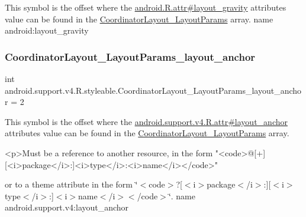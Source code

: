 This symbol is the offset where the \hyperlink{}{android.\+R.\+attr\#layout\+\_\+gravity} attribute\textquotesingle{}s value can be found in the \hyperlink{classandroid_1_1support_1_1v4_1_1R_1_1styleable_a9b9df68895be97c43703c5d0a130e2d9}{Coordinator\+Layout\+\_\+\+Layout\+Params} array.  name android\+:layout\+\_\+gravity \mbox{\label{classandroid_1_1support_1_1v4_1_1R_1_1styleable_aa0e6a723ba8e1e1b09bbd5bbcd81a3f2}} 
\subsubsection{\texorpdfstring{Coordinator\+Layout\+\_\+\+Layout\+Params\+\_\+layout\+\_\+anchor}{CoordinatorLayout\_LayoutParams\_layout\_anchor}}
{\footnotesize\ttfamily int android.\+support.\+v4.\+R.\+styleable.\+Coordinator\+Layout\+\_\+\+Layout\+Params\+\_\+layout\+\_\+anchor = 2\hspace{0.3cm}{\ttfamily [static]}}

This symbol is the offset where the \hyperlink{classandroid_1_1support_1_1v4_1_1R_1_1attr_a1bdef82525d3965c0bfa3c87fa463972}{android.\+support.\+v4.\+R.\+attr\#layout\+\_\+anchor} attribute\textquotesingle{}s value can be found in the \hyperlink{classandroid_1_1support_1_1v4_1_1R_1_1styleable_a9b9df68895be97c43703c5d0a130e2d9}{Coordinator\+Layout\+\_\+\+Layout\+Params} array.

\begin{DoxyVerb}      <p>Must be a reference to another resource, in the form "<code>@[+][<i>package</i>:]<i>type</i>:<i>name</i></code>"
\end{DoxyVerb}
 or to a theme attribute in the form \char`\"{}$<$code$>$?\mbox{[}$<$i$>$package$<$/i$>$\+:\mbox{]}\mbox{[}$<$i$>$type$<$/i$>$\+:\mbox{]}$<$i$>$name$<$/i$>$$<$/code$>$\char`\"{}.  name android.\+support.\+v4\+:layout\+\_\+anchor \mbox{\label{classandroid_1_1support_1_1v4_1_1R_1_1styleable_aebf704b49b05009455d48c43457e5b46}} 
